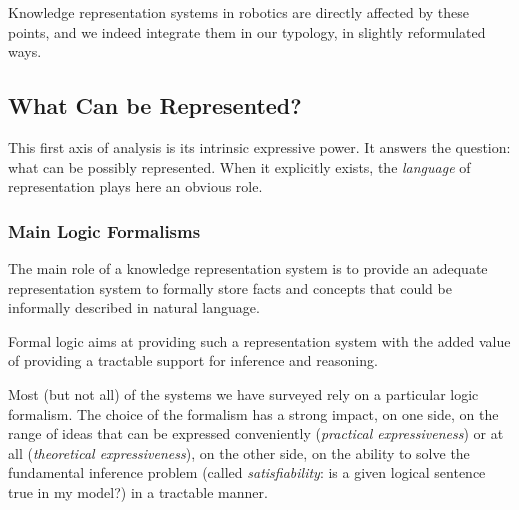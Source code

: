 Knowledge representation systems in robotics are directly affected by these
points, and we indeed integrate them in our typology, in slightly reformulated
ways.


\subsection{What Can be Represented?}
\label{sect|expressiveness}

\begin{scriptsize}
\begin{center}
\end{center}
\end{scriptsize}

This first axis of analysis is its intrinsic expressive power. It answers the
question: what can be possibly represented. When it explicitly exists, the
\emph{language} of representation plays here an obvious role.

\subsubsection{Main Logic Formalisms}

The main role of a knowledge representation system is to provide an adequate
representation system to formally store facts and concepts that could be informally
described in natural language.

Formal logic aims at providing such a representation system with the added
value of providing a tractable support for inference and reasoning.

Most (but not all) of the systems we have surveyed rely on a particular logic
formalism. The choice of the formalism has a strong impact, on one side, on the
range of ideas that can be expressed conveniently (\emph{practical
expressiveness}) or at all (\emph{theoretical expressiveness}), on the other
side, on the ability to solve the fundamental inference problem (called
\emph{satisfiability}: is a given logical sentence true in my model?) in a
tractable manner.

